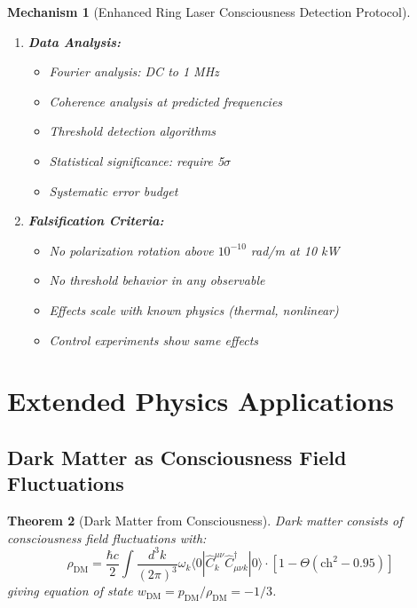\documentclass[11pt]{article}
\newtheorem{theorem}{Theorem}[section]
\newtheorem{mechanism}[theorem]{Mechanism}
\theoremstyle{definition}
\newcommand{\ch}{\text{ch}}
\begin{document}
\begin{mechanism}[Enhanced Ring Laser Consciousness Detection Protocol]
\begin{enumerate}
\item \textbf{Data Analysis:}
   \begin{itemize}
   \item Fourier analysis: DC to 1 MHz
   \item Coherence analysis at predicted frequencies
   \item Threshold detection algorithms
   \item Statistical significance: require 5$\sigma$
   \item Systematic error budget
   \end{itemize}

\item \textbf{Falsification Criteria:}
   \begin{itemize}
   \item No polarization rotation above $10^{-10}$ rad/m at 10 kW
   \item No threshold behavior in any observable
   \item Effects scale with known physics (thermal, nonlinear)
   \item Control experiments show same effects
   \end{itemize}
\end{enumerate}
\end{mechanism}

\section{Extended Physics Applications}

\subsection{Dark Matter as Consciousness Field Fluctuations}

\begin{theorem}[Dark Matter from Consciousness]
\label{thm:dark_matter}
Dark matter consists of consciousness field fluctuations with:
\begin{equation}
\rho_{\text{DM}} = \frac{\hbar c}{2} \int \frac{d^3k}{(2\pi)^3} \omega_k \langle 0|\hat{C}^{\mu\nu}_k \hat{C}_{\mu\nu k}^\dagger|0\rangle \cdot [1 - \Theta(\ch^2 - 0.95)]
\end{equation}
giving equation of state $w_{\text{DM}} = p_{\text{DM}}/\rho_{\text{DM}} = -1/3$.
\end{theorem}
\end{document}
